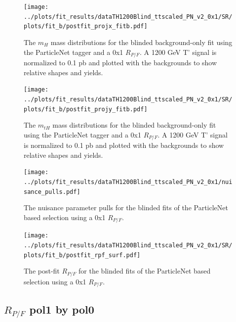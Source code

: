 \documentclass[10pt,oneside]{article}
\begin{document}
\begin{figure}[H]
    \centering
    \texttt{[image: ../plots/fit\_results/dataTH1200Blind\_ttscaled\_PN\_v2\_0x1/SR/plots/fit\_b/postfit\_projx\_fitb.pdf]}
    \caption{The $m_H$ mass distributions for the blinded background-only fit using the ParticleNet tagger and a 0x1 $R_{P/F}$.
    A 1200 GeV T' signal is normalized to 0.1 pb and plotted with the backgrounds to show relative shapes and yields.}
    \label{figs:PN_mh_0x1}
\end{figure}
\begin{figure}[H]
    \centering
    \texttt{[image: ../plots/fit\_results/dataTH1200Blind\_ttscaled\_PN\_v2\_0x1/SR/plots/fit\_b/postfit\_projy\_fitb.pdf]}
    \caption{The $m_{tH}$ mass distributions for the blinded background-only fit using the ParticleNet tagger and a 0x1 $R_{P/F}$.
    A 1200 GeV T' signal is normalized to 0.1 pb and plotted with the backgrounds to show relative shapes and yields.}
    \label{figs:PN_mth_0x1}
\end{figure}
\begin{figure}[H]
    \centering
    \texttt{[image: ../plots/fit\_results/dataTH1200Blind\_ttscaled\_PN\_v2\_0x1/nuisance\_pulls.pdf]}
    \caption{The nuisance parameter pulls for the blinded fits of the ParticleNet based selection using a 0x1 $R_{P/F}$.}
    \label{figs:PN_nuis_0x1}
\end{figure}
\begin{figure}[H]
    \centering
    \texttt{[image: ../plots/fit\_results/dataTH1200Blind\_ttscaled\_PN\_v2\_0x1/SR/plots/fit\_b/postfit\_rpf\_surf.pdf]}
    \caption{The post-fit $R_{P/F}$ for the blinded fits of the ParticleNet based selection using a 0x1 $R_{P/F}$.}
    \label{figs:PN_rpf_0x1}
\end{figure}

\subsection{\texorpdfstring{$R_{P/F}$}{Rpf} pol1 by pol0}
\end{document}
